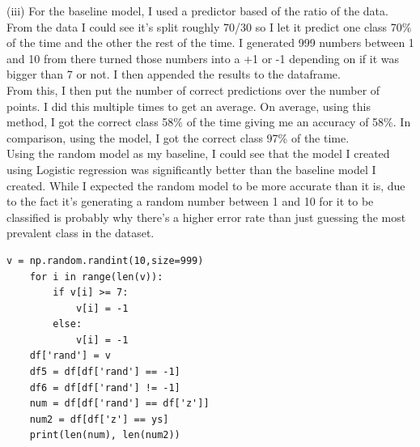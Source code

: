 \documentclass[10pt,a4paper]{article}
\begin{document}
(iii)
For the baseline model, I used a predictor based of the ratio of the data. From the data I could see it's split roughly 70/30 so I let it predict one class 70\(\%\) of the time and the other the rest of the time. I generated 999 numbers between 1 and 10 from there turned those numbers into a +1 or -1 depending on if it was bigger than 7 or not. I then appended the results to the dataframe.
\\
From this, I then put the number of correct predictions over the number of points. I did this multiple times to get an average. On average, using this method, I got the correct class 58\(\%\) of the time giving me an accuracy of 58\(\%\). In comparison, using the model, I got the correct class 97\(\%\) of the time.
\\
Using the random model as my baseline, I could see that the model I created using Logistic regression was significantly better than the baseline model I created. While I expected the random model to be more accurate than it is, due to the fact it's generating a random number between 1 and 10 for it to be classified is probably why there's a higher error rate than just guessing the most prevalent class in the dataset.
\begin{verbatim}
v = np.random.randint(10,size=999)
    for i in range(len(v)):
        if v[i] >= 7:
            v[i] = -1
        else:
            v[i] = -1
    df['rand'] = v
    df5 = df[df['rand'] == -1]
    df6 = df[df['rand'] != -1]
    num = df[df['rand'] == df['z']]
    num2 = df[df['z'] == ys]
    print(len(num), len(num2))
\end{verbatim}
\end{document}
